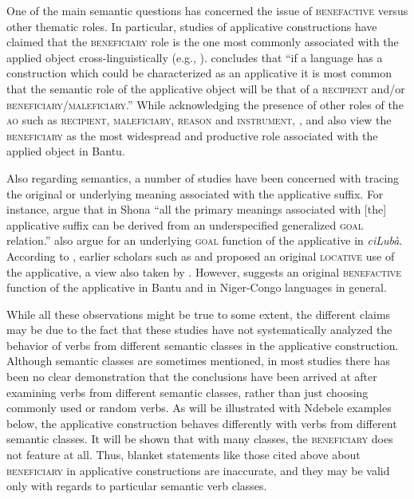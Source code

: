 \documentclass[output=paper]{langsci/langscibook}
\begin{document}
One of the main semantic questions has concerned the issue of \textsc{benefactive} versus other thematic roles. In particular, studies of applicative constructions have claimed that the \textsc{beneficiary} role is the one most commonly associated with the applied object cross-linguistically (e.g., \citealt{Peterson2007,Polinsky2008,KittilaZuniga2010}). \citet[40]{Peterson2007} concludes that “if a language has a construction which could be characterized as an applicative it is most common that the semantic role of the applicative object will be that of a \textsc{recipient} and/or \textsc{beneficiary}/\textsc{maleficiary.”} While acknowledging the presence of other roles of the \textsc{ao} such as \textsc{recipient}, \textsc{maleficiary}, \textsc{reason} and \textsc{instrument}, \citet{Schadeberg2003}, \citet[101]{deKindBostoen2012} and  \citet[1]{MartenKula2014} also view the \textsc{beneficiary} as the most widespread and productive role associated with the applied object in Bantu. 

Also regarding semantics, a number of studies have been concerned with tracing the original or underlying meaning associated with the applicative suffix. For instance, \citet[3]{CannMabugu2007} argue that in Shona “all the primary meanings associated with [the] applicative suffix can be derived from an underspecified generalized \textsc{goal} relation.”   \citet{deKindBostoen2012} also argue for an underlying \textsc{goal} function of the applicative in \textit{ciLubà}. According to \citet{Trithart1983}, earlier scholars such as \citet{Endemann1876,vanEeden1956} and  \citet{KahlerMeyer1966} proposed an original \textsc{locative} use of the applicative, a view also taken by \citet[74]{Schadeberg2003}. However, \citet[75]{Trithart1983} suggests an original \textsc{benefactive} function of the applicative in Bantu and in Niger-Congo languages in general. 

While all these observations might be true to some extent, the different claims may be due to the fact that these studies have not systematically analyzed the behavior of verbs from different semantic classes in the applicative construction. Although semantic classes are sometimes mentioned, in most studies there has been no clear demonstration that the conclusions have been arrived at after examining verbs from different semantic classes, rather than just choosing commonly used or random verbs. As will be illustrated with Ndebele examples below, the applicative construction behaves differently with verbs from different semantic classes. It will be shown that with many classes, the \textsc{beneficiary} does not feature at all. Thus, blanket statements like those cited above about \textsc{beneficiary} in applicative constructions are inaccurate, and they may be valid only with regards to particular semantic verb classes.
\end{document}
